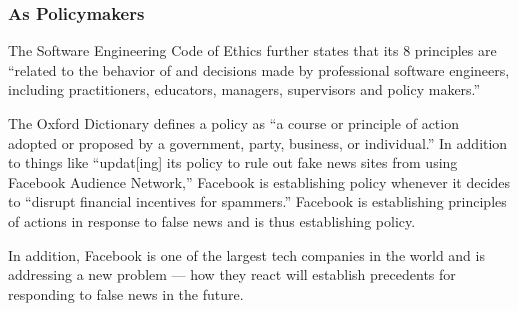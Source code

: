 \subsubsection{As Policymakers}

\par The Software Engineering Code of Ethics further states that its 8 principles are ``related to the behavior of and decisions made by professional software engineers, including practitioners, educators, managers, supervisors and policy makers.'' \cite{se_code}
 
\par The Oxford Dictionary defines a policy as ``a course or principle of action adopted or proposed by a government, party, business, or individual.'' \cite{oxford} In addition to things like ``updat[ing] its policy to rule out fake news sites from using Facebook Audience Network,'' \cite{tc_ban} Facebook is establishing policy whenever it decides to ``disrupt financial incentives for spammers.'' \cite{fb_hoaxes_2016} Facebook is establishing principles of actions in response to false news and is thus establishing policy.

\par In addition, Facebook is one of the largest tech companies in the world and is addressing a new problem --- how they react will establish precedents for responding to false news in the future.